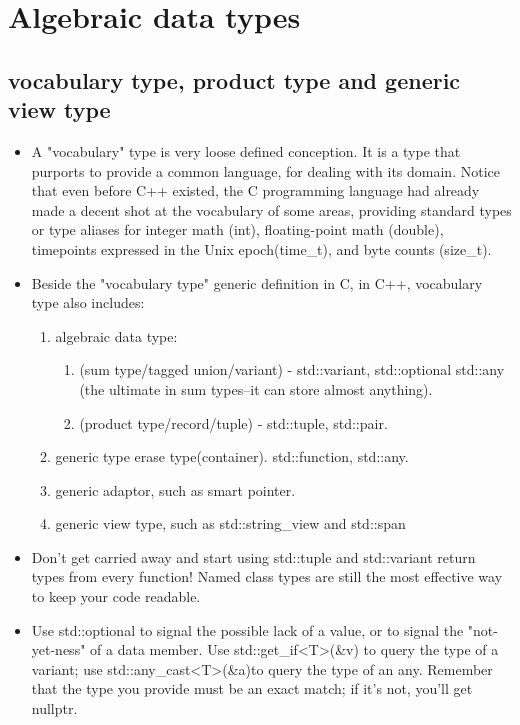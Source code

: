 \documentclass[a4paper,11pt,twoside]{book}
\begin{document}
\section{Algebraic data types}

\subsection{vocabulary type, product type and generic view type}
\begin{itemize}
	
	\item A "vocabulary" type is very loose defined conception. It is a type that purports to provide a common language, for dealing with its domain. Notice that even before C++ existed, the C programming language had already made a decent shot at the vocabulary of some areas, providing standard types or type aliases for integer math (int), floating-point math (double), timepoints expressed in the Unix epoch(time\_t), and byte counts (size\_t).
	
	\item Beside the "vocabulary type" generic definition in C, in C++, vocabulary type also includes: 
	\begin{enumerate}
		\item algebraic data type:
		 \begin{enumerate}
		 	\item (sum type/tagged union/variant) - std::variant, std::optional std::any (the ultimate in sum types--it can store almost anything).
		 	\item (product type/record/tuple) - std::tuple, std::pair.
		 \end{enumerate}
		\item generic type erase type(container). std::function, std::any.
		\item generic adaptor, such as smart pointer.
		\item generic view type, such as std::string\_view and std::span
	\end{enumerate}
	
	\item Don't get carried away and start using std::tuple and std::variant return types from every function! Named class types are still the most effective way to keep your code readable. 
	
	\item Use std::optional to signal the possible lack of a value, or to signal the "not-yet-ness" of a data member. Use std::get\_if<T>(\&v) to query the type of a variant; use std::any\_cast<T>(\&a)to query the type of an any. Remember that the type you provide must be an exact match; if it's not, you'll get nullptr.
	

\end{itemize}
\end{document}
